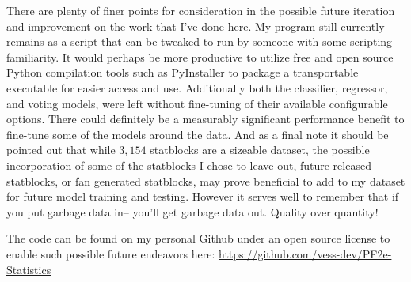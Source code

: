 \documentclass[11pt]{article}
\begin{document}
There are plenty of finer points for consideration in the possible future iteration and improvement on the work that I've done here. My program still currently remains as a script that can be tweaked to run by someone with some scripting familiarity. It would perhaps be more productive to utilize free and open source Python compilation tools such as PyInstaller \cite{pyinstaller} to package a transportable executable for easier access and use. Additionally both the classifier, regressor, and voting models, were left without fine-tuning of their available configurable options. There could definitely be a measurably significant performance benefit to fine-tune some of the models around the data. And as a final note it should be pointed out that while $3,154$ statblocks are a sizeable dataset, the possible incorporation of some of the statblocks I chose to leave out, future released statblocks, or fan generated statblocks, may prove beneficial to add to my dataset for future model training and testing. However it serves well to remember that if you put garbage data in-- you'll get garbage data out. Quality over quantity!

The code can be found on my personal Github under an open source license to enable such possible future endeavors here: \href{https://github.com/vess-dev/PF2e-Statistics}{https://github.com/vess-dev/PF2e-Statistics}

\newpage

\printbibliography
\end{document}
